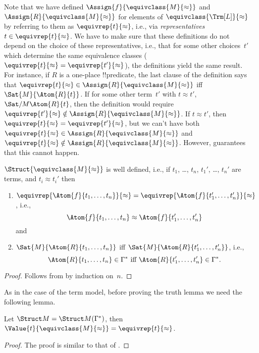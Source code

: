 \documentclass[../../../include/open-logic-section]{subfiles}
\begin{document}
\begin{explain}
Note that we have defined $\Assign{f}{\equivclass{M}{\approx}}$ and
$\Assign{R}{\equivclass{M}{\approx}}$ for elements of
$\equivclass{\Trm[L]}{\approx}$ by referring to them as
$\equivrep{t}{\approx}$, i.e., via \emph{representatives}~$t \in
\equivrep{t}{\approx}$.  We have to make sure that these definitions
do not depend on the choice of these representatives, i.e., that for
some other choices~$t'$ which determine the same equivalence classes
($\equivrep{t}{\approx} = \equivrep{t'}{\approx}$), the definitions
yield the same result. For instance, if $R$ is a one-place
!!{predicate}, the last clause of the definition says that
$\equivrep{t}{\approx} \in \Assign{R}{\equivclass{M}{\approx}}$ iff
$\Sat{M}{\Atom{R}{t}}$. If for some other term~$t'$ with $t \approx
t'$, $\Sat/{M}{\Atom{R}{t}}$, then the definition would require
$\equivrep{t'}{\approx} \notin \Assign{R}{\equivclass{M}{\approx}}$.
If $t \approx t'$, then $\equivrep{t}{\approx} =
\equivrep{t'}{\approx}$, but we can't have both $\equivrep{t}{\approx}
\in \Assign{R}{\equivclass{M}{\approx}}$ and $\equivrep{t}{\approx}
\notin \Assign{R}{\equivclass{M}{\approx}}$.  However,
 guarantees that this cannot happen.
\end{explain}

\begin{prop}
$\Struct{\equivclass{M}{\approx}}$ is well defined, i.e., if $t_1$,
  \dots, $t_n$, $t_1'$, \dots, $t_n'$ are terms, and $t_i \approx
  t_i'$ then
\begin{enumerate}
\item $\equivrep{\Atom{f}{t_1,\dots, t_n}}{\approx} =
    \equivrep{\Atom{f}{t_1',\dots, t_n'}}{\approx}$, i.e.,
  \[
  \Atom{f}{t_1,\dots, t_n} \approx \Atom{f}{t_1',\dots, t_n'}
  \]
  and
\item $\Sat{M}{\Atom{R}{t_1,\dots, t_n}}$ iff
  $\Sat{M}{\Atom{R}{t_1',\dots, t_n'}}$, i.e.,
  \[
    \Atom{R}{t_1,\dots, t_n} \in \Gamma^* \text{ iff }
    \Atom{R}{t_1',\dots, t_n'} \in \Gamma^*.
  \]
\end{enumerate}
\end{prop}

\begin{proof}
Follows from  by induction on~$n$.
\end{proof}

As in the case of the term model, before proving the truth lemma we need 
the following lemma.

\begin{lem} 
Let $\Struct M = \Struct M(\Gamma^*)$, then $\Value{t}{\equivclass{M}{\approx}} = \equivrep{t}{\approx}$.
\end{lem}
\begin{proof}
The proof is similar to that of .
\end{proof}
\end{document}

